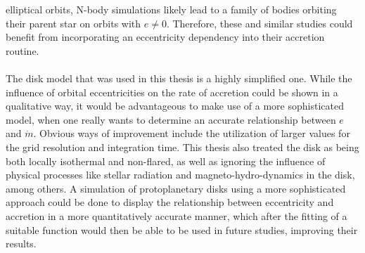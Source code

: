   elliptical orbits, N-body simulations likely lead to a family of bodies 
  orbiting their parent star on orbits with $e\neq0$. Therefore, these and 
  similar studies could benefit from incorporating 
  an eccentricity dependency into their accretion routine. \\
  \\
  The disk model that was used in this thesis is a highly simplified one. 
  While the influence of orbital eccentricities on the rate 
  of accretion could be shown in a qualitative way, it would be advantageous to make use of a 
  more sophisticated model, when one really wants to determine an accurate 
  relationship between $e$ and $\dot{m}$.
  Obvious ways of improvement include the 
  utilization of larger values for the grid resolution and integration time.
  This thesis also treated the disk as being both locally isothermal and 
  non-flared, as well as ignoring the influence of physical processes like 
  stellar radiation and magneto-hydro-dynamics in the disk, among others. 
  A simulation of protoplanetary disks using a more sophisticated approach 
  could be done to display the relationship between eccentricity and 
  accretion in a more quantitatively accurate manner, which after the fitting 
  of a suitable function would then be able to be used in future studies, 
  improving their results.




